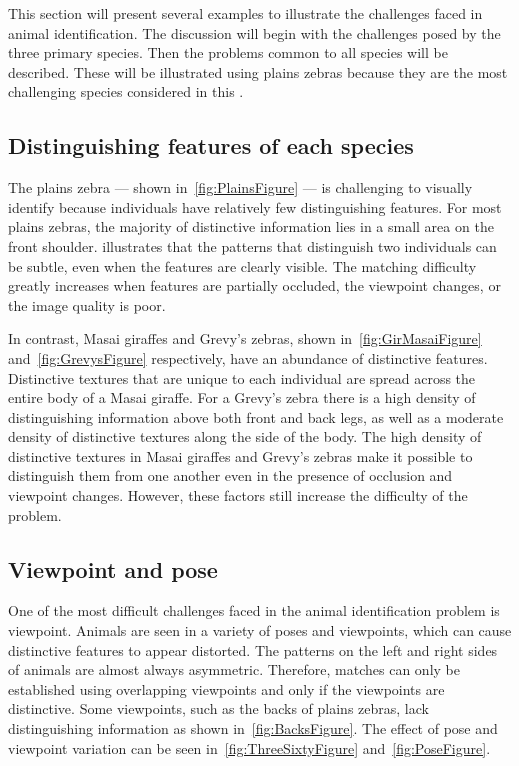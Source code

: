     This section will present several examples to illustrate the challenges faced in animal identification. The
    discussion will begin with the challenges posed by the three primary species. Then the problems common to all
    species will be described. These will be illustrated using plains zebras because they are the most challenging
    species considered in this \thesis{}.

    \subsection{Distinguishing features of each species}
        The plains zebra --- shown in~\cref{fig:PlainsFigure} --- is challenging to visually identify because
        individuals have relatively few distinguishing features. For most plains zebras, the majority of distinctive
        information lies in a small area on the front shoulder.  illustrates that the patterns
        that distinguish two individuals can be subtle, even when the features are clearly visible. The matching
        difficulty greatly increases when features are partially occluded, the viewpoint changes, or the image quality
        is poor.

        In contrast, Masai giraffes and Grevy's zebras, shown in~\cref{fig:GirMasaiFigure} and~\cref{fig:GrevysFigure}
        respectively, have an abundance of distinctive features. Distinctive textures that are unique to each individual
        are spread across the entire body of a Masai giraffe. For a Grevy's zebra there is a high density of
        distinguishing information above both front and back legs, as well as a moderate density of distinctive textures
        along the side of the body. The high density of distinctive textures in Masai giraffes and Grevy's zebras make
        it possible to distinguish them from one another even in the presence of occlusion and viewpoint changes.
        However, these factors still increase the difficulty of the problem.

        \PlainsFigure{}

        \HardCaseFigure{}

        \GirMasaiFigure{}

        \GrevysFigure{}

    \subsection{Viewpoint and pose}
        One of the most difficult challenges faced in the animal identification problem is viewpoint. Animals are seen
        in a variety of poses and viewpoints, which can cause distinctive features to appear distorted. The patterns on
        the left and right sides of animals are almost always asymmetric. Therefore, matches can only be established
        using overlapping viewpoints and only if the viewpoints are distinctive. Some viewpoints, such as the backs of
        plains zebras, lack distinguishing information as shown in~\cref{fig:BacksFigure}. The effect of pose and
        viewpoint variation can be seen in~\cref{fig:ThreeSixtyFigure} and~\cref{fig:PoseFigure}.

